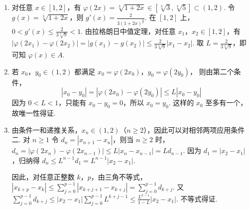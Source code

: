 \begin{solution}
\begin{enumerate}
\item 对任意 \(x\in[1,2]\)，有
\(\varphi(2x)=\sqrt[3]{1+2x}\in\left[\sqrt[3]{3},\sqrt[3]{5}\right]\subset(1,2)\). 令 \(g(x)=\sqrt[3]{1+2x}\)，则 \(g'(x)=\frac{2}{3(1+2x)^{\frac{2}{3}}}\). 在 \([1,2]\) 上，\(0<g'(x)\leqslant\frac{2}{3\sqrt[3]{9}}<1\). 由拉格朗日中值定理，对任意 \(x_1\)，\(x_2\in[1,2]\)，有 \(\left|\varphi(2x_1)-\varphi(2x_2)\right|=|g(x_1)-g(x_2)|\leqslant\frac{2}{3\sqrt[3]{9}}|x_1-x_2|\).
取 \(L=\frac{2}{3\sqrt[3]{9}}\)，即可知 \(\varphi(x)\in A\).

\item 若 \(x_0\)，\(y_0\in(1,2)\) 都满足
\(x_0=\varphi(2x_0)\)，\(y_0=\varphi(2y_0)\)，
则由第二个条件，
\[
|x_0-y_0|
=|\varphi(2x_0)-\varphi(2y_0)|
\leqslant L|x_0-y_0|
\]
因为 \(0<L<1\)，只能有 \(x_0-y_0=0\)，所以 \(x_0=y_0\). 这样的 \(x_0\) 至多有一个，故唯一性得证.

\item 由条件一和递推关系，\(x_n\in(1,2)\)（\(n\geqslant2\)），因此可以对相邻两项应用条件二. 对 \(n\geqslant1\) 令 \(d_n=|x_{n+1}-x_n|\)，则当 \(n\geqslant2\) 时，\(d_n=|\varphi(2x_n)-\varphi(2x_{n-1})|\leqslant L|x_n-x_{n-1}|=Ld_{n-1}\). 因为 \(d_1=|x_2-x_1|\)，归纳得 \(d_n\leqslant L^{n-1}d_1=L^{n-1}|x_2-x_1|\).

因此，对任意正整数 \(k\)，\(p\)，由三角不等式，\(|x_{k+p}-x_k|\leqslant\sum_{j=0}^{p-1}|x_{k+j+1}-x_{k+j}|=\sum_{j=0}^{p-1}d_{k+j}\). 又 \(\sum_{j=0}^{p-1}d_{k+j}\leqslant |x_2-x_1|\sum_{j=0}^{p-1}L^{k+j-1}\leqslant\frac{L^{k-1}}{1-L}|x_2-x_1|\). 不等式得证.
\end{enumerate}
\end{solution}
